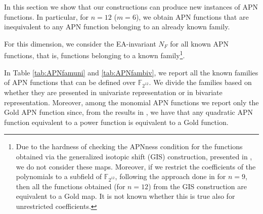 \documentclass{article}
\begin{document}
In this section we show that our constructions can produce new instances of APN functions. In particular, for $n=12$ ($m=6$), we obtain APN functions that are inequivalent to any APN function belonging to an already known family.

For this dimension, we consider the EA-invariant $N_F$ for all known APN functions, that is, functions belonging to a known family\footnote{Due to the hardness of checking the APNness condition for the  functions obtained via the generalized isotopic shift (GIS) construction, presented in \cite{seta18-1}, we do not consider these maps.
Moreover, if we restrict the coefficients of the polynomials to a subfield of $\mathbb{F}_{2^{12}}$, following the approach  done in \cite{seta18-1} for $n=9$, then all the functions obtained (for $n=12$) from the GIS construction are equivalent to a Gold map. It is not known whether this is true also for unrestricted coefficients.
}.

In Table \ref{tab:APNfamuni} and \ref{tab:APNfambiv}, we report all the known families of APN functions that can be defined over $\mathbb{F}_{2^{12}}$. {We divide the families based on whether they are presented  in univariate representation or in bivariate representation.} Moreover, among the monomial APN functions we report only the Gold APN function since, from the results in \cite{yoshi16}, we have that any quadratic APN function equivalent to a power function is equivalent to a Gold function.
\end{document}
